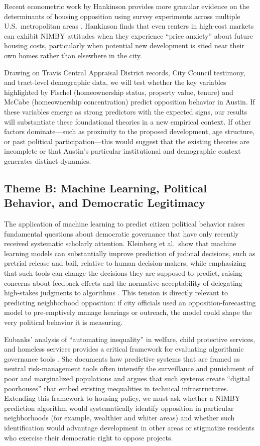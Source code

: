 \documentclass[12pt]{article}
\begin{document}
Recent econometric work by Hankinson provides more granular evidence on the determinants of housing opposition using survey experiments across multiple U.S.\ metropolitan areas \autocite{hankinson2018}. Hankinson finds that even renters in high-cost markets can exhibit NIMBY attitudes when they experience ``price anxiety'' about future housing costs, particularly when potential new development is sited near their own homes rather than elsewhere in the city.

Drawing on Travis Central Appraisal District records, City Council testimony, and tract-level demographic data, we will test whether the key variables highlighted by Fischel (homeownership status, property value, tenure) and McCabe (homeownership concentration) predict opposition behavior in Austin. If these variables emerge as strong predictors with the expected signs, our results will substantiate these foundational theories in a new empirical context. If other factors dominate---such as proximity to the proposed development, age structure, or past political participation---this would suggest that the existing theories are incomplete or that Austin's particular institutional and demographic context generates distinct dynamics.

\subsection{Theme B: Machine Learning, Political Behavior, and Democratic Legitimacy}

The application of machine learning to predict citizen political behavior raises fundamental questions about democratic governance that have only recently received systematic scholarly attention. Kleinberg et al.\ show that machine learning models can substantially improve prediction of judicial decisions, such as pretrial release and bail, relative to human decision-makers, while emphasizing that such tools can change the decisions they are supposed to predict, raising concerns about feedback effects and the normative acceptability of delegating high-stakes judgments to algorithms \autocite{kleinberg2018}. This tension is directly relevant to predicting neighborhood opposition: if city officials used an opposition-forecasting model to pre-emptively manage hearings or outreach, the model could shape the very political behavior it is measuring.

Eubanks' analysis of ``automating inequality'' in welfare, child protective services, and homeless services provides a critical framework for evaluating algorithmic governance tools \autocite{eubanks2018}. She documents how predictive systems that are framed as neutral risk-management tools often intensify the surveillance and punishment of poor and marginalized populations and argues that such systems create ``digital poorhouses'' that embed existing inequalities in technical infrastructures. Extending this framework to housing policy, we must ask whether a NIMBY prediction algorithm would systematically identify opposition in particular neighborhoods (for example, wealthier and whiter areas) and whether such identification would advantage development in other areas or stigmatize residents who exercise their democratic right to oppose projects.
\end{document}
